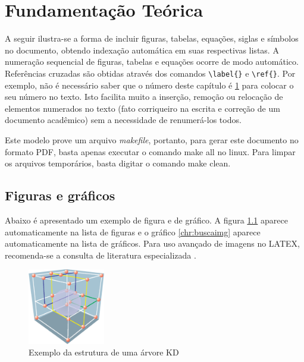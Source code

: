 %
%

\chapter{Fundamentação Teórica}
\label{chap:fundamentacaoTeorica}

A seguir ilustra-se a forma de incluir figuras, tabelas, equações, siglas e símbolos no documento, obtendo indexação automática em suas respectivas listas. A numeração sequencial de figuras, tabelas e equações ocorre de modo automático. Referências cruzadas são obtidas através dos comandos \verb#\label{}# e \verb#\ref{}#. Por exemplo, não é necessário saber que o número deste capítulo é \ref{chap:fundamentacaoTeorica} para colocar o seu número no texto. Isto facilita muito a inserção, remoção ou relocação de elementos numerados no texto (fato corriqueiro na escrita e correção de um documento acadêmico) sem a necessidade de renumerá-los todos.

Este modelo prove um arquivo \textit{makefile}, portanto, para gerar este documento no formato PDF, basta apenas executar o comando {\ttfamily make all} no linux. Para limpar os arquivos temporários, basta digitar o comando {\ttfamily make clean}.

\section{Figuras e gráficos}
\label{sec:figuras}

Abaixo é apresentado um exemplo de figura e de gráfico. A figura \ref{fig:kdtree} aparece automaticamente na lista de figuras e o gráfico \ref{chr:buscaimg} aparece automaticamente na lista de gráficos. Para uso avançado de imagens no LATEX, recomenda-se a consulta de literatura especializada \cite{Goossens2007}.

\begin{figure}[!htb]
	\centering
	\includegraphics[width=0.3\textwidth]{./figuras/figkdtree.eps}
	\caption{Exemplo da estrutura de uma árvore KD}
	\label{fig:kdtree}
\end{figure}

